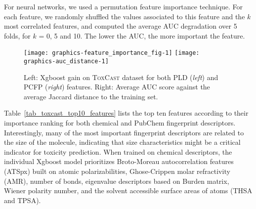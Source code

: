 \documentclass[11pt,a4paper]{article}
\begin{document}
For neural networks, we used a permutation feature importance technique. For each feature, we 
randomly shuffled the values associated to this feature and the $k$ most correlated features, 
and computed the average AUC degradation over 5 folds, for $k$ = 0, 5 and 10. The lower the AUC, 
the more important the feature.

\begin{figure}
  \centering 
  \texttt{[image: graphics-feature\_importance\_fig-1]} 
  \texttt{[image: graphics-auc\_distance-1]} 
  \caption{Left: Xgboost gain on \textsc{ToxCast} dataset for both PLD (\emph{left}) 
  and PCFP (\emph{right}) features. Right: Average AUC score against the average Jaccard distance to the
  training set.}  
  \label{fig_importance_cumulativegain}
\end{figure}  

Table~\ref{tab_toxcast_top10_features} lists the top ten features according to 
their importance ranking for both chemical and PubChem fingerprint descriptors. 
Interestingly, many of the most important fingerprint descriptors are
related to the size of the molecule, indicating that size characteristics might
be a critical indicator for toxicity prediction.
When trained on chemical descriptors, 
the individual Xgboost model prioritizes Broto-Moreau autocorrelation
features (ATSpx) built on atomic polarizabilities, Ghose-Crippen molar
refractivity (AMR), number of bonds, eigenvalue descriptors based on Burden
matrix, Wiener polarity number, and the solvent accessible surface areas of 
atoms (THSA and TPSA).    
\end{document}
